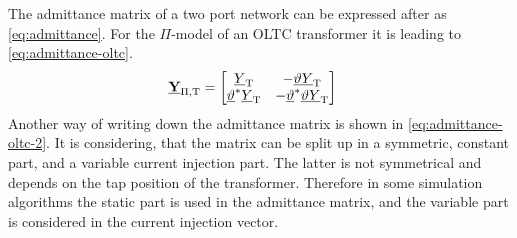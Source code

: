 The admittance matrix of a two port network can be expressed after \textcite{machowskiPowerSystemDynamics2020} as \autoref{eq:admittance}. For the $\Pi$-model of an \acs{OLTC} transformer it is leading to \autoref{eq:admittance-oltc}.
\begin{align}
    \underline{\mathrm{\textbf{Y}}}_\mathrm{\Pi,T}&= 
    \begin{bmatrix}
        \underline{Y}_\mathrm{T} & -\underline{\vartheta}\underline{Y}_\mathrm{T} \\
        \underline{\vartheta}^*\underline{Y}_\mathrm{T} & -\underline{\vartheta}^*\underline{\vartheta}\underline{Y}_\mathrm{T}
    \end{bmatrix} \label{eq:admittance-oltc}
\end{align}
Another way of writing down the admittance matrix is shown in \autoref{eq:admittance-oltc-2}. It is considering, that the matrix can be split up in a symmetric, constant part, and a variable current injection part. The latter is not symmetrical and depends on the tap position of the transformer. Therefore in some simulation algorithms the static part is used in the admittance matrix, and the variable part is considered in the current injection vector. \autocite{machowskiPowerSystemDynamics2020}
